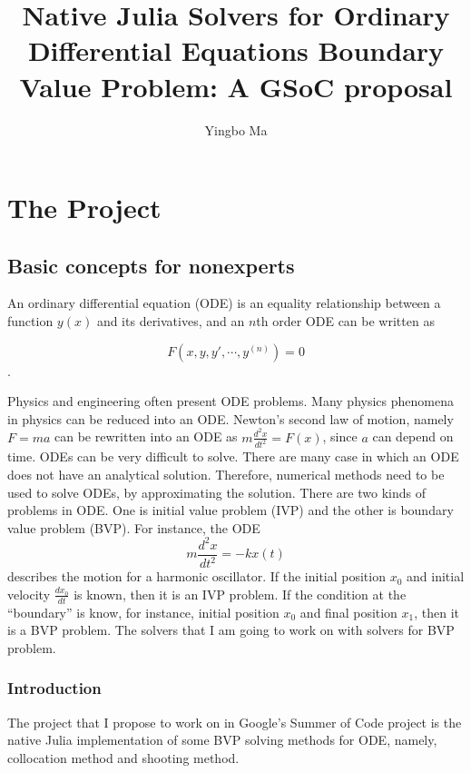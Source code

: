 \documentclass[a4paper,12pt,onecolumn]{article}
\author{Yingbo Ma}
\title{Native Julia Solvers for Ordinary Differential Equations Boundary Value Problem: A GSoC proposal}
\begin{document}
\nocite{*}
\maketitle
\maketitle
\tableofcontents



\section{The Project} %
\label{sec:the_project}

\subsection{Basic concepts for nonexperts} %
\label{sub:basic_concepts_for_nonexperts}
An ordinary differential equation (ODE)  is an equality relationship between a function $y(x)$
and its derivatives, and an $n$th order ODE can be written as

\[F(x, y, y', \cdots, y^{(n)}) = 0\].

Physics and engineering often present ODE problems. Many physics phenomena in physics can be reduced into an ODE. Newton's second law of motion, namely $F=ma$ can be rewritten into an ODE as $m\frac{d^2x}{dt^2}
=F(x)$, since $a$ can depend on time. ODEs can be very difficult to solve. There are many case in which an ODE does not have an analytical solution. Therefore, numerical methods need to be used to solve
ODEs, by approximating the solution. There are two kinds of problems in ODE. One is initial
value problem (IVP) and the other is boundary value problem (BVP). For instance, the ODE
\[m\frac{d^2x}{dt^2} = -kx(t)\]
describes the motion for a harmonic oscillator. If the initial position $x_0$ and initial velocity
$\frac{dx_0}{dt}$ is known, then it is an IVP problem. If the condition at the ``boundary'' is know,
for instance, initial position $x_0$ and final position $x_1$, then it is a BVP problem. The solvers
that I am going to work on with solvers for BVP problem.

\subsubsection{Introduction} %
\label{ssub:introduction}
The project that I propose to work on in Google's Summer of Code project is the native Julia
implementation of some BVP solving methods for ODE, namely, collocation method and shooting method.
\end{document}
